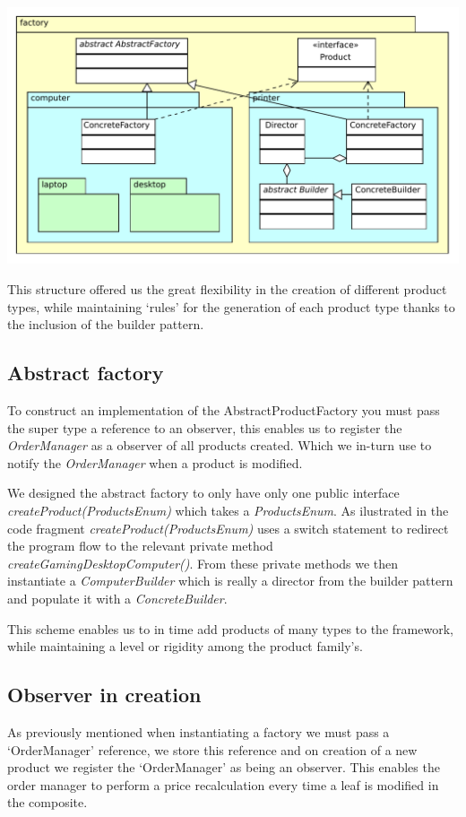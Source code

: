 \documentclass[pdftex,11pt,a4paper]{article}
\begin{document}
\begin{center}
	\includegraphics[scale=0.75]{images/creational_diagram.pdf}
\end{center}

This structure offered us the great flexibility in the creation of different product types, while maintaining ‘rules’ for the generation of each product type thanks to the inclusion of the builder pattern.

\subsection{Abstract factory}

To construct an implementation of the AbstractProductFactory you must pass the super type a reference to an observer, this enables us to register the \emph{OrderManager} as a observer of all products created. Which we in-turn use to notify the \emph{OrderManager} when a product is modified.

We designed the abstract factory to only have only one public interface \emph{createProduct(ProductsEnum)} which takes a \emph{ProductsEnum}. As ilustrated in the code fragment \emph{createProduct(ProductsEnum)} uses a switch statement to redirect the program flow to the relevant private method \emph{createGamingDesktopComputer()}. From these private methods we then instantiate a \emph{ComputerBuilder} which is really a director from the builder pattern and populate it with a \emph{ConcreteBuilder}.

This scheme enables us to in time add products of many types to the framework, while maintaining a level or rigidity among the product family's.



\subsection{Observer in creation}
As previously mentioned when instantiating a factory we must pass a ‘OrderManager’ reference, we store this reference and on creation of a new product we register the ‘OrderManager’ as being an observer. This enables the order manager to perform a price recalculation every time a leaf is modified in the composite.
\end{document}
